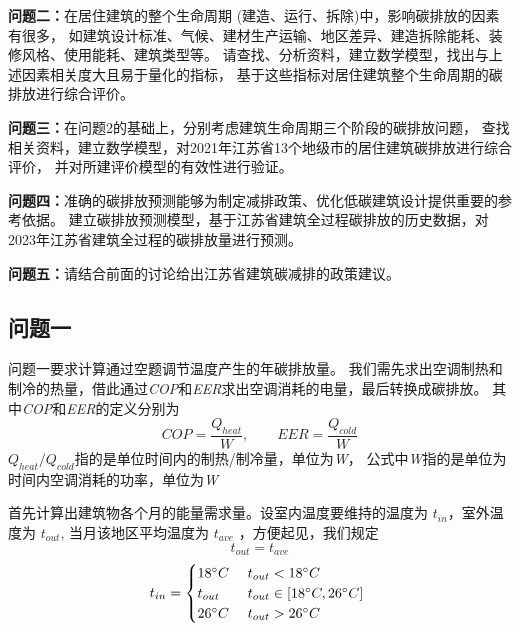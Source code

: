 \documentclass[a4paper, 12pt]{article}
\numberwithin{equation}{section}
\begin{document}
            \textbf{问题二：}在居住建筑的整个生命周期 (建造、运行、拆除)中，影响碳排放的因素有很多，
            如建筑设计标准、气候、建材生产运输、地区差异、建造拆除能耗、装修风格、使用能耗、建筑类型等。
            请查找、分析资料，建立数学模型，找出与上述因素相关度大且易于量化的指标，
            基于这些指标对居住建筑整个生命周期的碳排放进行综合评价。

            \textbf{问题三：}在问题2的基础上，分别考虑建筑生命周期三个阶段的碳排放问题，
            查找相关资料，建立数学模型，对2021年江苏省13个地级市的居住建筑碳排放进行综合评价，
            并对所建评价模型的有效性进行验证。

            \textbf{问题四：}准确的碳排放预测能够为制定减排政策、优化低碳建筑设计提供重要的参考依据。
            建立碳排放预测模型，基于江苏省建筑全过程碳排放的历史数据，对2023年江苏省建筑全过程的碳排放量进行预测。

            \textbf{问题五：}请结合前面的讨论给出江苏省建筑碳减排的政策建议。


    {}
        \subsection{问题一}
            问题一要求计算通过空题调节温度产生的年碳排放量。
            我们需先求出空调制热和制冷的热量，借此通过\textit{COP}和\textit{EER}求出空调消耗的电量，最后转换成碳排放。
            其中\textit{COP}和\textit{EER}的定义分别为
            \begin{equation}
                COP = \frac{Q_{heat}}{W},\hspace{2em} EER = \frac{Q_{cold}}{W}
            \end{equation}
            $ Q_{heat} / Q_{cold} $指的是单位时间内的制热/制冷量，单位为\textit{W}，
            公式中\textit{W}指的是单位为时间内空调消耗的功率，单位为\textit{W}

            首先计算出建筑物各个月的能量需求量。设室内温度要维持的温度为 $ t_{in} $，室外温度为 $ t_{out} $,
            当月该地区平均温度为 $ t_{ave} $ ，方便起见，我们规定
            \begin{equation*}
                t_{out} = t_{ave}
            \end{equation*}
            \begin{equation*}
                t_{in} =
                \begin{cases}
                    18 ^{\circ}C & \text{ $ t_{out} < 18 ^{\circ}C $ } \\
                    t_{out} & \text{ $ t_{out} \in [18 ^{\circ}C, 26 ^{\circ}C] $ } \\
                    26 ^{\circ}C & \text{ $ t_{out} > 26 ^{\circ}C $}
                \end{cases}
            \end{equation*}
\end{document}
